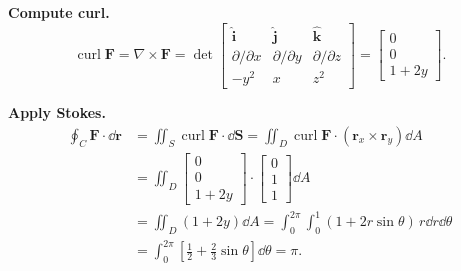 \begin{example}
  \textbf{Compute curl.}
  \[
    \operatorname{curl}\mathbf{F} = \nabla\times\mathbf{F}
    = \det
    \begin{bmatrix}
      \hat{\mathbf{i}}    & \hat{\mathbf{j}}    & \hat{\mathbf{k}}    \\
      \partial/\partial x & \partial/\partial y & \partial/\partial z \\
      -y^2                & x                   & z^2
    \end{bmatrix}
    =
    \begin{bmatrix}
      0 \\ 0 \\ 1+2y
    \end{bmatrix}
    .
  \]

  \textbf{Apply Stokes.}
  \begin{align*}
    \oint_C \mathbf{F}\cdot\dd{\mathbf{r}}
     & = \iint_S \operatorname{curl}\mathbf{F}\cdot\dd{\mathbf{S}}
    = \iint_D \operatorname{curl}\mathbf{F}\cdot(\mathbf{r}_x\times\mathbf{r}_y)\dd{A} \\
     & = \iint_D
    \begin{bmatrix}
      0 \\ 0 \\ 1+2y
    \end{bmatrix}
    \cdot
    \begin{bmatrix}
      0 \\ 1 \\ 1
    \end{bmatrix}
    \dd{A}                                                                             \\
     & = \iint_D (1+2y)\dd{A}
    = \int_0^{2\pi}\!\int_0^1 (1+2r\sin\theta)\,r\dd{r}\dd{\theta}                     \\
     & = \int_0^{2\pi}\left[\tfrac{1}{2}+\tfrac{2}{3}\sin\theta\right]\dd{\theta}
    = \pi.
  \end{align*}
\end{example}
